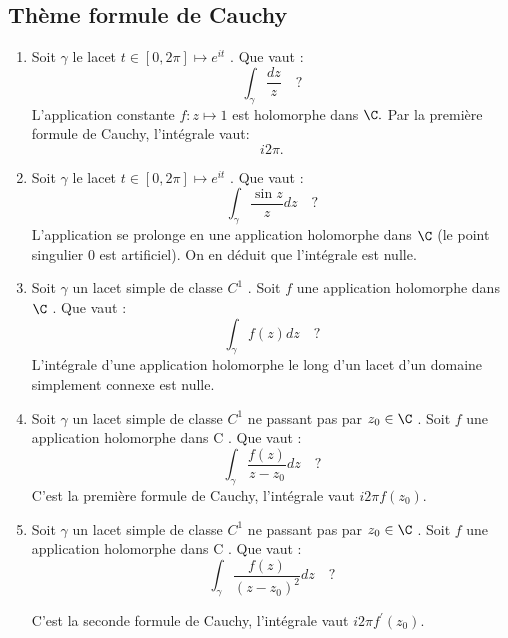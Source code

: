 \documentclass[a4paper, 12pt]{amsart}
\begin{document}
\subsection{Thème formule de Cauchy}
\begin{enumerate}
	\item Soit $\gamma$ le lacet $t \in [0, 2\pi] \mapsto e^{it}$ . Que vaut :
	\[
	\int_\gamma \frac{dz}{z} \quad ?
	\] 
    L'application constante $f \colon z \mapsto 1$ est holomorphe dans $\C.$ Par la première formule de Cauchy, l'intégrale vaut:
    \[
    i2\pi.
    \]
	\item Soit $\gamma$ le lacet $t \in [0, 2\pi] \mapsto e^{it}$ . Que vaut :
	\[
	\int_\gamma \frac{\sin z}{z} dz \quad ?
	\] 
    L'application se prolonge en une application holomorphe dans $\C$ (le point singulier $0$ est artificiel). On en déduit que l'intégrale est nulle.
	\item Soit $\gamma$ un lacet simple de classe $C^1$ . Soit $f$ une application holomorphe dans
	$\C$ . Que vaut :
		\[
	\int_\gamma f(z) dz \quad ?
	\] 
    L'intégrale d'une application holomorphe le long d'un lacet d'un domaine simplement connexe est nulle.
	\item Soit  $\gamma$  un lacet simple de classe $C^1$ ne passant pas par $z_0 \in \C$ . Soit $f$ une
	application holomorphe dans C . Que vaut :
	\[
\int_\gamma \frac{f(z)}{z-z_0} dz \quad ?
\] 
    C'est la première formule de Cauchy, l'intégrale vaut $i 2 \pi f(z_0).$
		\item Soit  $\gamma$  un lacet simple de classe $C^1$ ne passant pas par $z_0 \in \C$ . Soit $f$ une
	application holomorphe dans C . Que vaut :
	\[
	\int_\gamma \frac{f(z)}{(z-z_0)^2} dz \quad ?
	\]

    C'est la seconde formule de Cauchy, l'intégrale vaut $i 2 \pi f^\prime(z_0).$
\end{enumerate}
\end{document}
